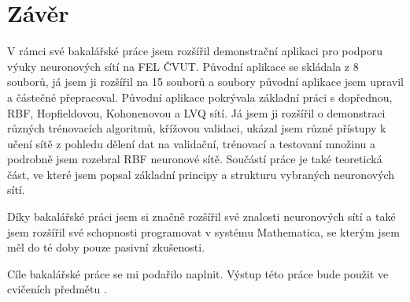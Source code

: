 \documentclass[11pt,twoside,a4paper]{book}
\begin{document}
\chapter{Závěr}
V rámci své bakalářské práce jsem rozšířil demonstrační aplikaci pro podporu výuky neuronových sítí na FEL ČVUT. Původní aplikace se skládala z 8 souborů, já jsem ji rozšířil na 15 souborů a soubory původní aplikace jsem upravil a částečné přepracoval. Původní aplikace pokrývala základní práci s dopřednou, RBF, Hopfieldovou, Kohonenovou a LVQ sítí. Já jsem ji rozšířil o demonstraci různých trénovacích algoritmů, křížovou validaci, ukázal jsem různé přístupy k učení sítě z pohledu dělení dat na validační, trénovací a testovaní množinu a podrobně jsem rozebral  RBF neuronové sítě. Součástí práce je také teoretická část, ve které jsem popsal základní principy a strukturu vybraných neuronových sítí.

Díky bakalářské práci jsem si značně rozšířil své znalosti neuronových sítí a také jsem rozšířil své schopnosti programovat v systému Mathematica, se kterým jsem měl do té doby pouze pasivní zkušenosti.

Cíle bakalářské práce se mi podařilo naplnit. Výstup této práce bude použit ve cvičeních předmětu .

%




%
{
\def\CS{$\cal C\kern-0.1667em\lower.5ex\hbox{$\cal S$}\kern-0.075em $}

}

%
\end{document}

